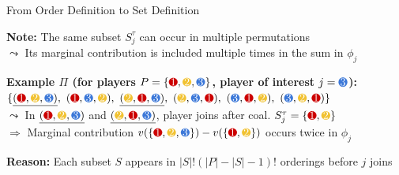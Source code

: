 \documentclass[10pt,compress,t,notes=noshow, xcolor=table]{beamer}
\newcommand{\Stau}{S_{j}^\tau}%
\begin{document}
\begin{framev}[align=top]{From Order Definition to Set Definition}
\begin{itemizeM}
\item<1-> \textbf{Note:} The same subset $\Stau$ can occur in multiple permutations\\
$\leadsto$ Its marginal contribution is included multiple times in the sum in $\phi_j$
\item<1-> \textbf{Example $\Pi$ (for players $P = \{\colorcircle{playerred}{white}{1},\colorcircle{playeryellow}{white}{2},\colorcircle{playerblue}{white}{3}\}$, player of interest $j = \colorcircle{playerblue}{white}{3}$):}\\
\spacer[0.25]
$\{
\underline{\color{black}(\colorcircle{playerred}{white}{1},\colorcircle{playeryellow}{white}{2},\colorcircle{playerblue}{white}{3})},\ 
(\colorcircle{playerred}{white}{1},\colorcircle{playerblue}{white}{3},\colorcircle{playeryellow}{white}{2}),\ 
\underline{\color{black}(\colorcircle{playeryellow}{white}{2},\colorcircle{playerred}{white}{1},\colorcircle{playerblue}{white}{3})},\ 
(\colorcircle{playeryellow}{white}{2},\colorcircle{playerblue}{white}{3},\colorcircle{playerred}{white}{1}),\ 
(,\colorcircle{playerred}{white}{1},\colorcircle{playeryellow}{white}{2}),\ 
(\colorcircle{playerblue}{white}{3},\colorcircle{playeryellow}{white}{2},\colorcircle{playerred}{white}{1})
\}$
\\
\spacer[0.25]
$\leadsto$ In $\underline{\color{black}(\colorcircle{playerred}{white}{1},\colorcircle{playeryellow}{white}{2},\colorcircle{playerblue}{white}{3})}$ and $\underline{\color{black}(\colorcircle{playeryellow}{white}{2},\colorcircle{playerred}{white}{1},\colorcircle{playerblue}{white}{3})}$, player \colorcircle{playerblue}{white}{3} joins after coal. ${\color{black} \Stau = \{\colorcircle{playerred}{white}{1},\colorcircle{playeryellow}{white}{2}\}}$
\\
$\Rightarrow$ Marginal contribution $v(\{\colorcircle{playerred}{white}{1},\colorcircle{playeryellow}{white}{2},\colorcircle{playerblue}{white}{3}\}) - v(\{\colorcircle{playerred}{white}{1},\colorcircle{playeryellow}{white}{2}\})$ occurs twice in $\phi_j$
\item<1-> \textbf{Reason:} Each subset $S$ appears in $|S|!(|P| - |S| - 1)!$ orderings before $j$ joins\\

\end{itemizeM}
\end{framev}
\end{document}
